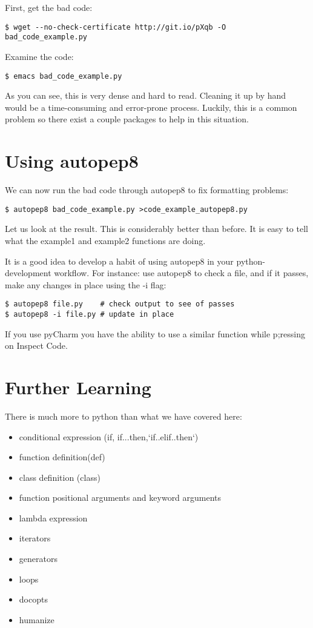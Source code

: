 First, get the bad code:

\begin{verbatim}
$ wget --no-check-certificate http://git.io/pXqb -O bad_code_example.py
\end{verbatim}

Examine the code:

\begin{verbatim}
$ emacs bad_code_example.py
\end{verbatim}

As you can see, this is very dense and hard to read. Cleaning it up by
hand would be a time-consuming and error-prone process. Luckily, this is
a common problem so there exist a couple packages to help in this
situation.

\section{Using autopep8}\label{using-autopep8}

We can now run the bad code through autopep8 to fix formatting problems:

\begin{verbatim}
$ autopep8 bad_code_example.py >code_example_autopep8.py
\end{verbatim}

Let us look at the result. This is considerably better than before. It
is easy to tell what the example1 and example2 functions are doing.

It is a good idea to develop a habit of using autopep8 in your
python-development workflow. For instance: use autopep8 to check a file,
and if it passes, make any changes in place using the -i flag:

\begin{verbatim}
$ autopep8 file.py    # check output to see of passes
$ autopep8 -i file.py # update in place
\end{verbatim}

If you use pyCharm you have the ability to use a similar function while
p;ressing on Inspect Code.

\section{Further Learning}\label{further-learning}

There is much more to python than what we have covered here:

\begin{itemize}
\tightlist
\item
  conditional expression (if, if...then,`if..elif..then`)
\item
  function definition(def)
\item
  class definition (class)
\item
  function positional arguments and keyword arguments
\item
  lambda expression
\item
  iterators
\item
  generators
\item
  loops
\item
  docopts
\item
  humanize
\end{itemize}

